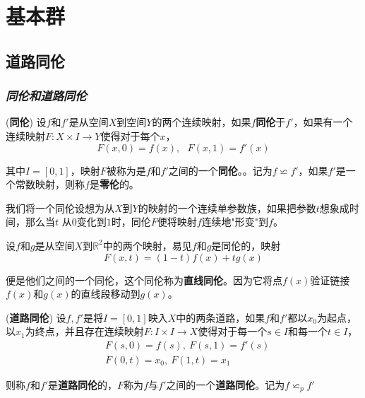 \chapter{基本群}

\section{道路同伦}

\subsection*{\textsl{同伦和道路同伦}}

\begin{define}(\textbf{同伦})
    设$f$和$f'$是从空间$X$到空间$Y$的两个连续映射，如果$f$\textbf{同伦}于$f'$，如果有一个连续映射$F:X\times I\rightarrow Y$使得对于每个$x$，
    \begin{equation}
        F(x,0)=f(x),\ \ \ F(x,1)=f'(x)
    \end{equation}

    其中$I=[0,1]$，映射$F$被称为是$f$和$f'$之间的一个\textbf{同伦}。。记为$f\backsimeq f'$，如果$f'$是一个常数映射，则称$f$是\textbf{零伦}的。
\end{define}

\vspace*{1em}

我们将一个同伦设想为从$X$到$Y$的映射的一个连续单参数族，如果把参数$t$想象成时间，那么当$t$
从$0$变化到$1$时，同伦$F$便将映射$f$连续地"形变"到$f$。

\vspace*{1em} 

\begin{example}
    设$f$和$g$是从空间$X$到$\mathbb{R}^2$中的两个映射，易见$f$和$g$是同伦的，映射
    \begin{equation}
        F(x,t)=(1-t)f(x)+tg(x)
    \end{equation}

    便是他们之间的一个同伦，这个同伦称为\textbf{直线同伦}。因为它将点$f(x)$验证链接$f(x)$和$g(x)$的直线段移动到$g(x)$。
\end{example}

\begin{define}(\textbf{道路同伦})
    设$f,f'$是将$I=[0,1]$映入$X$中的两条道路，如果$f$和$f'$都以$x_0$为起点，以$x_1$为终点，并且存在连续映射$F:I\times I\rightarrow X$使得对于每一个$s\in I$和每一个$t\in I$，
    \begin{equation}
        \begin{aligned}
            & F(s,0)=f(s),\ F(s,1)=f'(s)\\
            & F(0,t)=x_0,\ F(1,t)=x_1
        \end{aligned}
    \end{equation}

    则称$f$和$f'$是\textbf{道路同伦}的，$F$称为$f$与$f'$之间的一个\textbf{道路同伦}。记为$f\backsimeq_p f'$
\end{define}

